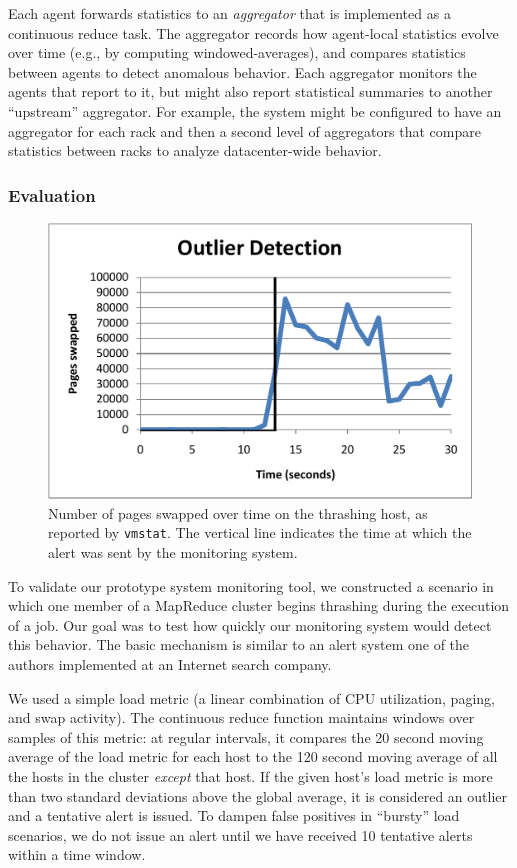 Each agent forwards statistics to an {\em aggregator} that is implemented as a
continuous reduce task. The aggregator records how agent-local statistics evolve
over time (e.g., by computing windowed-averages), and compares statistics
between agents to detect anomalous behavior. Each aggregator monitors the agents
that report to it, but might also report statistical summaries to another
``upstream'' aggregator. For example, the system might be configured to have an
aggregator for each rack and then a second level of aggregators that compare
statistics between racks to analyze datacenter-wide behavior.

\subsubsection{Evaluation}
\begin{figure}[t]
\ssp
  \centering
  \includegraphics[scale=0.6]{figures/continue.pdf}
  \caption{Number of pages swapped over time on the thrashing host, as reported
    by \texttt{vmstat}.  The vertical line indicates the time at which the alert
    was sent by the monitoring system.}
\label{fig:outlier}
\end{figure}

To validate our prototype system monitoring tool, we constructed a
scenario in which one member of a MapReduce cluster begins thrashing
during the execution of a job. Our goal was to test how quickly our
monitoring system would detect this behavior. The basic mechanism is
similar to an alert system one of the authors implemented at an
Internet search company.

We used a simple load metric (a linear combination of CPU utilization,
paging, and swap activity). The continuous reduce function maintains
windows over samples of this metric: at regular intervals, it
compares the 20 second moving average of the load metric for each host
to the 120 second moving average of all the hosts in the cluster
{\em except} that host.  If the given host's load metric is more
than two standard deviations above the global average, it is
considered an outlier and a tentative alert is issued.  To dampen
false positives in ``bursty'' load scenarios, we do not issue an alert
until we have received 10 tentative alerts within a time window.

